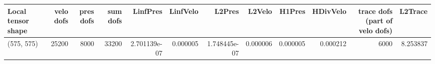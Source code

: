 \begin{tabular}{lrrrrrrrrrrr}
\toprule
Local tensor shape &  velo dofs &  pres dofs &  sum dofs &     LinfPres &  LinfVelo &       L2Pres &   L2Velo &   H1Pres &  HDivVelo &  trace dofs (part of velo dofs) &  L2Trace \\
\midrule
        (575, 575) &      25200 &       8000 &     33200 & 2.701139e-07 &  0.000005 & 1.748445e-07 & 0.000006 & 0.000005 &  0.000212 &                            6000 & 8.253837 \\
\bottomrule
\end{tabular}
